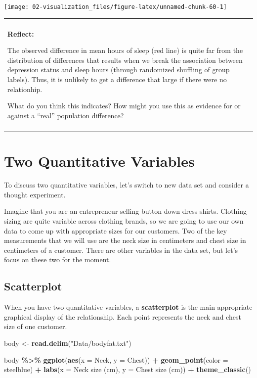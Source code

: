 \documentclass[
]{book}
\newenvironment{Shaded}{\begin{snugshade}}{\end{snugshade}}
\newcommand{\AttributeTok}[1]{\textcolor[rgb]{0.13,0.29,0.53}{#1}}
\newcommand{\FunctionTok}[1]{\textcolor[rgb]{0.13,0.29,0.53}{\textbf{#1}}}
\newcommand{\NormalTok}[1]{#1}
\newcommand{\OtherTok}[1]{\textcolor[rgb]{0.56,0.35,0.01}{#1}}
\newcommand{\SpecialCharTok}[1]{\textcolor[rgb]{0.81,0.36,0.00}{\textbf{#1}}}
\newcommand{\StringTok}[1]{\textcolor[rgb]{0.31,0.60,0.02}{#1}}
\newenvironment{reflect}
{
    \begin{center}
    
    \begin{tabular}{|p{0.8\textwidth}|}
    \rowcolor{LightBlue}
    \hline\\
    \rowcolor{LightBlue}
    \textbf{Reflect:}
}
{
    \\\rowcolor{LightBlue}
    \\\hline
    \end{tabular} 
    \end{center}
}
\begin{document}
\begin{center}\texttt{[image: 02-visualization\_files/figure-latex/unnamed-chunk-60-1]} \end{center}

\begin{reflect}
The observed difference in mean hours of sleep (red line) is quite far
from the distribution of differences that results when we break the
association between depression status and sleep hours (through
randomized shuffling of group labels). Thus, it is unlikely to get a
difference that large if there were no relationhip.

What do you think this indicates? How might you use this as evidence for
or against a ``real'' population difference?
\end{reflect}

\section{Two Quantitative Variables}\label{two-quantitative-variables}

To discuss two quantitative variables, let's switch to new data set and consider a thought experiment.

Imagine that you are an entrepreneur selling button-down dress shirts. Clothing sizing are quite variable across clothing brands, so we are going to use our own data to come up with appropriate sizes for our customers. Two of the key measurements that we will use are the neck size in centimeters and chest size in centimeters of a customer. There are other variables in the data set, but let's focus on these two for the moment.

\subsection{Scatterplot}\label{scatterplot}

When you have two quantitative variables, a \textbf{scatterplot} is the main appropriate graphical display of the relationship. Each point represents the neck and chest size of one customer.

\begin{Shaded}
\begin{Highlighting}[]
\NormalTok{body }\OtherTok{\textless{}{-}} \FunctionTok{read.delim}\NormalTok{(}\StringTok{"Data/bodyfat.txt"}\NormalTok{)}

\NormalTok{body }\SpecialCharTok{\%\textgreater{}\%}
    \FunctionTok{ggplot}\NormalTok{(}\FunctionTok{aes}\NormalTok{(}\AttributeTok{x =}\NormalTok{ Neck, }\AttributeTok{y =}\NormalTok{ Chest)) }\SpecialCharTok{+}
    \FunctionTok{geom\_point}\NormalTok{(}\AttributeTok{color =} \StringTok{\textquotesingle{}steelblue\textquotesingle{}}\NormalTok{) }\SpecialCharTok{+} 
    \FunctionTok{labs}\NormalTok{(}\AttributeTok{x =} \StringTok{\textquotesingle{}Neck size (cm)\textquotesingle{}}\NormalTok{, }\AttributeTok{y =} \StringTok{\textquotesingle{}Chest size (cm)\textquotesingle{}}\NormalTok{) }\SpecialCharTok{+}
    \FunctionTok{theme\_classic}\NormalTok{()}
\end{Highlighting}
\end{Shaded}
\end{document}

